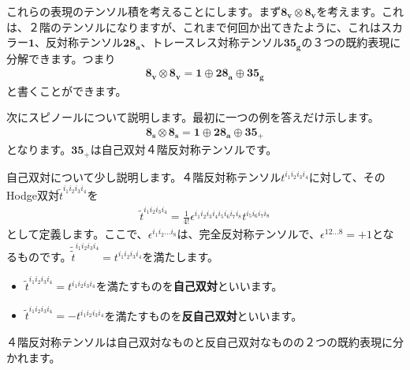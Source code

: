 \documentclass[report,paper=a4, fontsize=12pt, line_length=16cm, number_of_lines=34,dvipdfmx]{jlreq}
\numberwithin{equation}{chapter}
\numberwithin{equation}{section}
\newcommand{\kyou}[1]{{\sffamily \bfseries #1}}
\newcommand{\triv}{\mathbf{1}}
\newcommand{\etv}{\mathbf{8_v}}
\newcommand{\ets}{\mathbf{8_s}}
\newcommand{\tweta}{\mathbf{28_{a}}}
\newcommand{\thfvg}{\mathbf{35_{g}}}
\newcommand{\thfvp}{\mathbf{35}_{+}}
\begin{document}
これらの表現のテンソル積を考えることにします。まず$\etv\otimes\etv$を考えます。これは、２階のテンソルになりますが、これまで何回か出てきたように、これはスカラー$\triv$、反対称テンソル$\tweta$、トレースレス対称テンソル$\thfvg$の３つの既約表現に分解できます。つまり
\begin{align}
  \etv\otimes\etv=\triv \oplus \tweta\oplus \thfvg
\end{align}
と書くことができます。

次にスピノールについて説明します。最初に一つの例を答えだけ示します。
\begin{align}
  \ets\otimes\ets=\triv \oplus \tweta \oplus \thfvp
  \label{tensor8s8s}
\end{align}
となります。$\thfvp$は自己双対４階反対称テンソルです。

自己双対について少し説明します。４階反対称テンソル$t^{i_1i_2i_3i_4}$に対して、そのHodge双対$\tilde{t}^{i_1i_2i_3i_4}$を
\begin{align}
  \tilde{t}^{i_1i_2i_3i_4}=\frac{1}{4!}\epsilon^{i_1i_2i_3i_4i_5i_6i_7i_8}t^{i_5i_6i_7i_8}
\end{align}
として定義します。ここで、$\epsilon^{i_1i_2\dots i_8}$は、完全反対称テンソルで、$\epsilon^{12\dots 8}=+1$となるものです。$\tilde{\tilde{t}}^{i_1i_2i_3i_4}=t^{i_1i_2i_3i_4}$を満たします。
\begin{itemize}
  \item $\tilde{t}^{i_1i_2i_3i_4}=t^{i_1i_2i_3i_4}$を満たすものを\kyou{自己双対}といいます。
  \item $\tilde{t}^{i_1i_2i_3i_4}=-t^{i_1i_2i_3i_4}$を満たすものを\kyou{反自己双対}といいます。
\end{itemize}
４階反対称テンソルは自己双対なものと反自己双対なものの２つの既約表現に分かれます。
\end{document}
